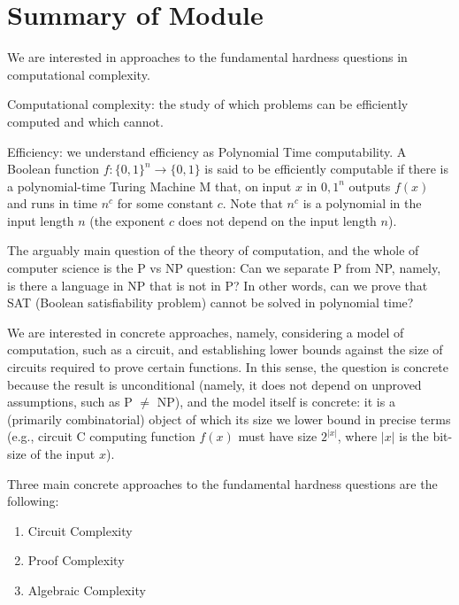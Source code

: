 %
%  
%
%






\section{Summary of Module}
\label{sec:1}

 We are interested in approaches to the fundamental hardness questions in computational complexity.

Computational complexity: the study of which problems can be efficiently computed and which cannot.

Efficiency: we understand efficiency as Polynomial Time computability. A Boolean function $f:\{0,1\}^n\to\{0,1\}$ is said to be efficiently computable if there is a polynomial-time Turing Machine M that, on input $x$ in ${0,1}^n$ outputs $f(x)$ and runs in time $n^c$ for some constant $c$. Note that $n^c$ is a polynomial in the input length $n$ (the exponent $c$ does not depend on the input length $n$). 

The arguably main question of the theory of computation, and the whole of computer science is the P vs NP question: Can we separate P from NP, namely, is there a language in NP that is not in P? In other words, can we prove that SAT (Boolean satisfiability problem) cannot be solved in polynomial time?

We are interested in concrete approaches, namely, considering a model of computation, such as a circuit, and establishing lower bounds against the size of circuits required to prove certain functions. In this sense, the question is concrete because the result is unconditional (namely, it does not depend on unproved assumptions, such as P $\neq$ NP), and the model itself is concrete: it is a (primarily combinatorial) object of which its size we lower bound in precise terms (e.g., circuit C computing function $f(x)$ must have size $2^{|x|}$, where $|x|$ is the bit-size of the input $x$).
\medskip 

Three main concrete approaches to the fundamental hardness questions are the following:

\begin{enumerate}
\item  Circuit Complexity 
\item Proof Complexity 
\item Algebraic Complexity
\end{enumerate}

